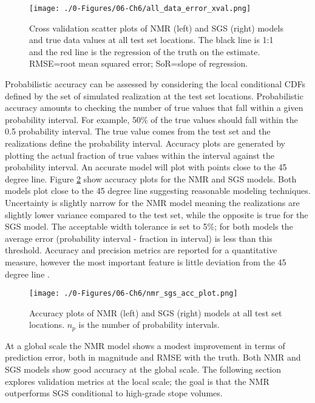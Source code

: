 \begin{figure}[htb!]
    \centering
    \texttt{[image: ./0-Figures/06-Ch6/all\_data\_error\_xval.png]}
    \caption{Cross validation scatter plots of  \gls{NMR} (left) and \gls{SGS} (right) models and true data values at all test set locations. The black line is 1:1 and the red line is the regression of the truth on the estimate. RMSE=root mean squared error; SoR=slope of regression.}
    \label{fig:all_data_error_xval}
\end{figure}

Probabilistic accuracy can be assessed by considering the local conditional \glspl{CDF} defined by the set of simulated realization at the test set locations. Probabilistic accuracy amounts to checking the number of true values that fall within a given probability interval. For example, 50\% of the true values should fall within the 0.5 probability interval. The true value comes from the test set and the realizations define the probability interval. Accuracy plots are generated by plotting the actual fraction of true values within the interval against the probability interval. An accurate model will plot with points close to the 45 degree line. Figure \ref{fig:nmr_sgs_acc_plot} show accuracy plots for the \gls{NMR} and \gls{SGS} models. Both models plot close to the 45 degree line suggesting reasonable modeling techniques. Uncertainty is slightly narrow for the \gls{NMR} model meaning the realizations are slightly lower variance compared to the test set, while the opposite is true for the \gls{SGS} model. The acceptable width tolerance is set to 5\%; for both models the average error (probability interval - fraction in interval) is less than this threshold. Accuracy and precision metrics are reported for a quantitative measure, however the most important feature is little deviation from the 45 degree line \citep{deutsch2010display}.

\begin{figure}[htb!]
    \centering
    \texttt{[image: ./0-Figures/06-Ch6/nmr\_sgs\_acc\_plot.png]}
    \caption{Accuracy plots of  \gls{NMR} (left) and \gls{SGS} (right) models at all test set locations. $n_{p}$ is the number of probability intervals. }
    \label{fig:nmr_sgs_acc_plot}
\end{figure}

At a global scale the \gls{NMR} model shows a modest improvement in terms of prediction error, both in magnitude and \gls{RMSE} with the truth. Both \gls{NMR} and \gls{SGS} models show good accuracy at the global scale. The following section explores validation metrics at the local scale; the goal is that the \gls{NMR} outperforms \gls{SGS} conditional to high-grade stope volumes.

